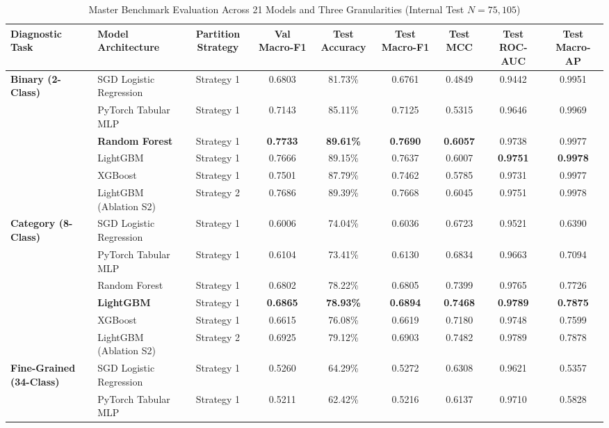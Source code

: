 \documentclass[conference,10pt,twocolumn]{IEEEtran}
\begin{document}
\begin{table}[t]
\centering
\caption{Master Benchmark Evaluation Across 21 Models and Three Granularities (Internal Test $N=75,105$)}
\label{tab:master_benchmark_results}
\small
\begin{tabular}{@{}llccccccc@{}}
\toprule
\textbf{Diagnostic Task} & \textbf{Model Architecture} & \textbf{Partition Strategy} & \textbf{Val Macro-F1} & \textbf{Test Accuracy} & \textbf{Test Macro-F1} & \textbf{Test MCC} & \textbf{Test ROC-AUC} & \textbf{Test Macro-AP} \\ \midrule
\multirow{6}{*}{\textbf{Binary (2-Class)}} 
& SGD Logistic Regression & Strategy 1 & 0.6803 & 81.73\% & 0.6761 & 0.4849 & 0.9442 & 0.9951 \\
& PyTorch Tabular MLP & Strategy 1 & 0.7143 & 85.11\% & 0.7125 & 0.5315 & 0.9646 & 0.9969 \\
& \textbf{Random Forest} & Strategy 1 & \textbf{0.7733} & \textbf{89.61\%} & \textbf{0.7690} & \textbf{0.6057} & 0.9738 & 0.9977 \\
& LightGBM & Strategy 1 & 0.7666 & 89.15\% & 0.7637 & 0.6007 & \textbf{0.9751} & \textbf{0.9978} \\
& XGBoost & Strategy 1 & 0.7501 & 87.79\% & 0.7462 & 0.5785 & 0.9731 & 0.9977 \\
& LightGBM (Ablation S2) & Strategy 2 & 0.7686 & 89.39\% & 0.7668 & 0.6045 & 0.9751 & 0.9978 \\ \midrule
\multirow{6}{*}{\textbf{Category (8-Class)}} 
& SGD Logistic Regression & Strategy 1 & 0.6006 & 74.04\% & 0.6036 & 0.6723 & 0.9521 & 0.6390 \\
& PyTorch Tabular MLP & Strategy 1 & 0.6104 & 73.41\% & 0.6130 & 0.6834 & 0.9663 & 0.7094 \\
& Random Forest & Strategy 1 & 0.6802 & 78.22\% & 0.6805 & 0.7399 & 0.9765 & 0.7726 \\
& \textbf{LightGBM} & Strategy 1 & \textbf{0.6865} & \textbf{78.93\%} & \textbf{0.6894} & \textbf{0.7468} & \textbf{0.9789} & \textbf{0.7875} \\
& XGBoost & Strategy 1 & 0.6615 & 76.08\% & 0.6619 & 0.7180 & 0.9748 & 0.7599 \\
& LightGBM (Ablation S2) & Strategy 2 & 0.6925 & 79.12\% & 0.6903 & 0.7482 & 0.9789 & 0.7878 \\ \midrule
\multirow{9}{*}{\textbf{Fine-Grained (34-Class)}} 
& SGD Logistic Regression & Strategy 1 & 0.5260 & 64.29\% & 0.5272 & 0.6308 & 0.9621 & 0.5357 \\
& PyTorch Tabular MLP & Strategy 1 & 0.5211 & 62.42\% & 0.5216 & 0.6137 & 0.9710 & 0.5828 \\

\end{tabular}
\end{table}
\end{document}
